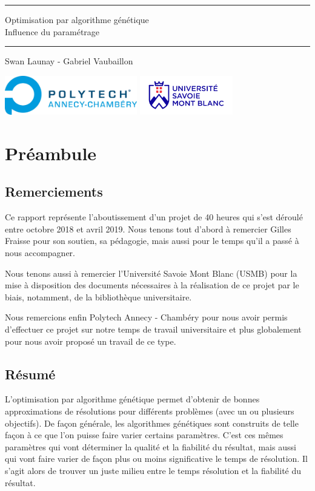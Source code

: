 \documentclass[12pt]{report}
\begin{document}
  \begin{titlepage}
    \centering
        \vfill
        {\rule{\linewidth}{.5pt}
        \huge
            Optimisation par algorithme génétique\\
          \large
            Influence du paramétrage\\
          \rule{\linewidth}{.5pt}
            \vskip2cm
            Swan Launay - Gabriel Vaubaillon\\
        }
        \vfill
        \includegraphics[height=1.7cm]{logo/polytech.jpg}
        \hfill
        \includegraphics[height=1.7cm]{logo/usmb.png}
  \end{titlepage}
  \chapter{Préambule}
    \section{Remerciements}
      Ce rapport représente l'aboutissement d'un projet de 40 heures qui s'est déroulé entre octobre 2018 et avril 2019. Nous tenons tout d'abord à remercier Gilles Fraisse pour son soutien, sa pédagogie, mais aussi pour le temps qu'il a passé à nous accompagner.

      Nous tenons aussi à remercier l'Université Savoie Mont Blanc (USMB) pour la mise à disposition des documents nécessaires à la réalisation de ce projet par le biais, notamment, de la bibliothèque universitaire.

      Nous remercions enfin Polytech Annecy - Chambéry pour nous avoir permis d'effectuer ce projet sur notre temps de travail universitaire et plus globalement pour nous avoir proposé un travail de ce type.

    \section{Résumé}
      L'optimisation par algorithme génétique permet d'obtenir de bonnes approximations de résolutions pour différents problèmes (avec un ou plusieurs objectifs). De façon générale, les algorithmes génétiques sont construits de telle façon à ce que l'on puisse faire varier certains paramètres. C'est ces mêmes paramètres qui vont déterminer la qualité et la fiabilité du résultat, mais aussi qui vont faire varier de façon plus ou moins significative le temps de résolution. Il s'agit alors de trouver un juste milieu entre le temps résolution et la fiabilité du résultat.
\end{document}
